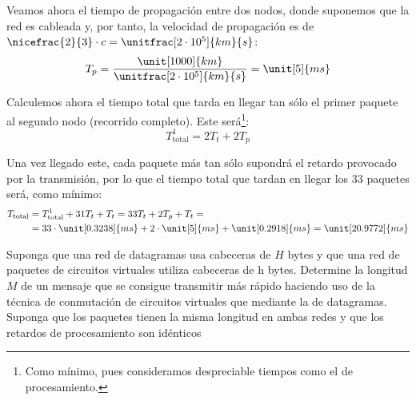 \begin{ejercicio}
    Veamos ahora el tiempo de propagación entre dos nodos, donde suponemos que la red es cableada y, por tanto, la velocidad de propagación es de $\nicefrac{2}{3}\cdot c=\unitfrac[2\cdot 10^5]{km}{s}$:
    \begin{equation*}
        T_p = \frac{\unit[1000]{km}}{\unitfrac[2\cdot 10^5]{km}{s}} = \unit[5]{ms}
    \end{equation*}

    Calculemos ahora el tiempo total que tarda en llegar tan sólo el primer paquete al segundo nodo (recorrido completo). Este será\footnote{Como mínimo, pues consideramos despreciable tiempos como el de procesamiento.}:
    \begin{equation*}
        T_{\text{total}}^1 = 2T_t + 2T_p
    \end{equation*}

    Una vez llegado este, cada paquete más tan sólo supondrá el retardo provocado por la transmisión, por lo que el tiempo total que tardan en llegar los $33$ paquetes será, como mínimo:
    \begin{align*}
        T_{\text{total}} &= T_{\text{total}}^1 + 31T_t + T_t
        = 33T_t + 2T_p + T_t
        =\\&= 33\cdot \unit[0.3238]{ms} + 2\cdot \unit[5]{ms} + \unit[0.2918]{ms}
        = \unit[20.9772]{ms}
    \end{align*}
\end{ejercicio}

\begin{ejercicio}
    Suponga que una red de datagramas usa cabeceras de $H$ bytes y que una red de paquetes de circuitos virtuales utiliza cabeceras de h bytes. Determine la longitud $M$ de un mensaje que se consigue transmitir más rápido haciendo uso de la técnica de conmutación de circuitos virtuales que mediante la de datagramas. Suponga que los paquetes tienen la misma longitud en ambas redes y que los retardos de procesamiento son idénticos
\end{ejercicio}

